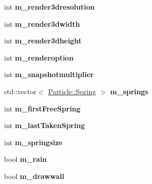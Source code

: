 \begin{DoxyCompactItemize}
\item 
\hypertarget{classWorld_ab117c6a9b7722174eaca306d31efe659}{int {\bfseries m\-\_\-render3dresolution}}\label{classWorld_ab117c6a9b7722174eaca306d31efe659}

\item 
\hypertarget{classWorld_a3420fa4e56c238d9ecfde566f6ed4fe1}{int {\bfseries m\-\_\-render3dwidth}}\label{classWorld_a3420fa4e56c238d9ecfde566f6ed4fe1}

\item 
\hypertarget{classWorld_a48cd762877e2d73e9351bd10e414a30a}{int {\bfseries m\-\_\-render3dheight}}\label{classWorld_a48cd762877e2d73e9351bd10e414a30a}

\item 
\hypertarget{classWorld_aa0e29bebd009b72fdf09d50bd169ed43}{int {\bfseries m\-\_\-renderoption}}\label{classWorld_aa0e29bebd009b72fdf09d50bd169ed43}

\item 
\hypertarget{classWorld_aed6bdbf56ce063a3e9835c8603de3a0a}{int {\bfseries m\-\_\-snapshotmultiplier}}\label{classWorld_aed6bdbf56ce063a3e9835c8603de3a0a}

\item 
\hypertarget{classWorld_a1f70eb1cad67b3d25bbd54388afab9b7}{std\-::vector$<$ \hyperlink{structParticle_1_1spring}{Particle\-::\-Spring} $>$ {\bfseries m\-\_\-springs}}\label{classWorld_a1f70eb1cad67b3d25bbd54388afab9b7}

\item 
\hypertarget{classWorld_a9f0cee184af137125a5aa1a3df490201}{int {\bfseries m\-\_\-first\-Free\-Spring}}\label{classWorld_a9f0cee184af137125a5aa1a3df490201}

\item 
\hypertarget{classWorld_aaca3ba1d3c6ba3eacf3e4b8f41938118}{int {\bfseries m\-\_\-last\-Taken\-Spring}}\label{classWorld_aaca3ba1d3c6ba3eacf3e4b8f41938118}

\item 
\hypertarget{classWorld_ad8ebe97063711ce9d61329cad0c0e1c1}{int {\bfseries m\-\_\-springsize}}\label{classWorld_ad8ebe97063711ce9d61329cad0c0e1c1}

\item 
\hypertarget{classWorld_a9ef5d83750b22cef2e093bb3bd6f20d4}{bool {\bfseries m\-\_\-rain}}\label{classWorld_a9ef5d83750b22cef2e093bb3bd6f20d4}

\item 
\hypertarget{classWorld_abfd22f9148bb879c907e003116fbee3b}{bool {\bfseries m\-\_\-drawwall}}\label{classWorld_abfd22f9148bb879c907e003116fbee3b}


\end{DoxyCompactItemize}
